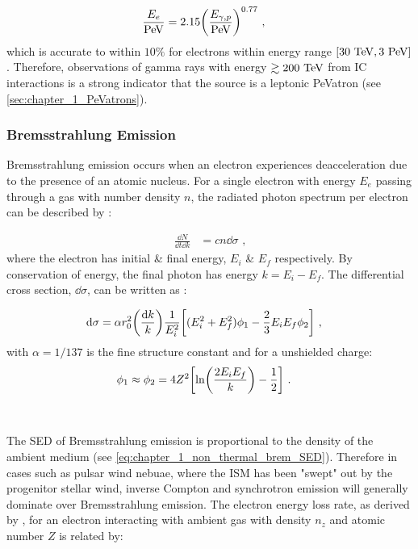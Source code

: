 \begin{equation}
    \begin{aligned}
    \frac{E_e}{\PeV}&=2.15 \qty(\frac{E_{\gamma,p}}{\PeV})^{0.77}\text{ ,}
    \end{aligned}
\end{equation}
which is accurate to within $10\%$ for electrons within energy range $[30~\TeV,3~\PeV]$. Therefore, observations of gamma rays with energy $\gtrsim 200~\TeV$ from IC interactions is a strong indicator that the source is a leptonic PeVatron (see \autoref{sec:chapter_1_PeVatrons}).

\subsubsection{Bremsstrahlung Emission}

Bremsstrahlung emission occurs when an electron experiences deacceleration due to the presence of an atomic nucleus. For a single electron with energy $E_e$ passing through a gas with number density $n$, the radiated photon spectrum per electron can be described by \citep{RevModPhys.42.237}:

\begin{equation}
	\begin{split}
		\frac{\dd{N}}{\dd{t}\dd{k}}&=cn\dd{\sigma} \text{ ,}
	\end{split} \label{eq:chapter_1_non_thermal_brem_SED}
\end{equation}
\noindent where the electron has initial \& final energy, $E_i$ \& $E_f$ respectively. By conservation of energy, the final photon has energy $k=E_i-E_f$. The differential cross section, $\dd{\sigma}$, can be written as \citep{1934RSPSA.146...83B}:

\begin{equation}
	\begin{split}
		\dd{\sigma}&=\alpha r_0^2\qty(\frac{\dd{k}}{k})\frac{1}{E_i^2}\qty[(E_i^2+E_f^2)\phi_1-\frac{2}{3}E_i E_f\phi_2]\text{ ,} \label{eq:chapter_1_non_thermal_brem_cross_section} 
	\end{split}
\end{equation}
\noindent with $\alpha=1/137$ is the fine structure constant and for a unshielded charge:
\begin{equation}
    \begin{aligned}
        \phi_1&\approx\phi_2=4Z^2\qty[\ln(\frac{2E_iE_f}{k})-\frac{1}{2}]\text{ .}
    \end{aligned}
\end{equation}
\par~\par
The SED of Bremsstrahlung emission is proportional to the density of the ambient medium (see \autoref{eq:chapter_1_non_thermal_brem_SED}). Therefore in cases such as pulsar wind nebuae, where the ISM has been "swept" out by the progenitor stellar wind, inverse Compton and synchrotron emission will generally dominate over Bremsstrahlung emission. The electron energy loss rate, as derived by \cite{RevModPhys.42.237}, for an electron interacting with ambient gas with density $n_z$ and atomic number $Z$ is related by:

